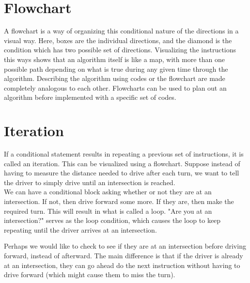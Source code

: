 \section{Flowchart}

A flowchart is a way of organizing this conditional nature of the directions in a visual way. Here, boxes are the individual directions, and the diamond is the condition which has two possible set of directions. Visualizing the instructions this ways shows that an algorithm itself is like a map, with more than one possible path depending on what is true during any given time through the algorithm. Describing the algorithm using codes or the flowchart are made completely analogous to each other. Flowcharts can be used to plan out an algorithm before implemented with a specific set of codes.\\

\begin{center} \end{center}

\section{Iteration}

If a conditional statement results in repeating a previous set of instructions, it is called an iteration. This can be visualized using a flowchart. Suppose instead of having to measure the distance needed to drive after each turn, we want to tell the driver to simply drive until an intersection is reached.\\

We can have a conditional block asking whether or not they are at an intersection. If not, then drive forward some more. If they are, then make the required turn. This will result in what is called a loop. "Are you at an intersection?" serves as the loop condition, which causes the loop to keep repeating until the driver arrives at an intersection. \\

\begin{center} \end{center}

Perhaps we would like to check to see if they are at an intersection before driving forward, instead of afterward. The main difference is that if the driver is already at an intersection, they can go ahead do the next instruction without having to drive forward (which might cause them to miss the turn).\\

